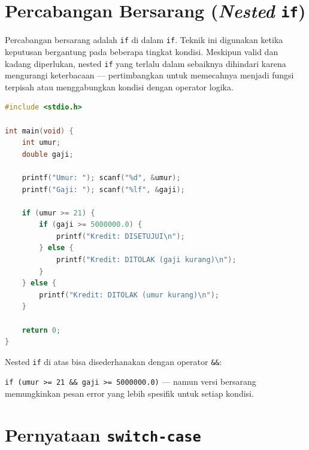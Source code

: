 \documentclass[../main.tex]{subfiles}
\begin{document}
\section{Percabangan Bersarang (\textit{Nested} \texttt{if})}

Percabangan bersarang adalah \texttt{if} di dalam \texttt{if}. Teknik ini digunakan ketika keputusan bergantung pada beberapa tingkat kondisi. Meskipun valid dan kadang diperlukan, nested \texttt{if} yang terlalu dalam sebaiknya dihindari karena mengurangi keterbacaan --- pertimbangkan untuk memecahnya menjadi fungsi terpisah atau menggabungkan kondisi dengan operator logika.

\begin{lstlisting}[language=C,caption=Nested \texttt{if} --- kelayakan kredit]
#include <stdio.h>

int main(void) {
    int umur;
    double gaji;
    
    printf("Umur: "); scanf("%d", &umur);
    printf("Gaji: "); scanf("%lf", &gaji);
    
    if (umur >= 21) {
        if (gaji >= 5000000.0) {
            printf("Kredit: DISETUJUI\n");
        } else {
            printf("Kredit: DITOLAK (gaji kurang)\n");
        }
    } else {
        printf("Kredit: DITOLAK (umur kurang)\n");
    }
    
    return 0;
}
\end{lstlisting}

\begin{catatan}
Nested \texttt{if} di atas bisa disederhanakan dengan operator \texttt{\&\&}:

\texttt{if (umur >= 21 \&\& gaji >= 5000000.0)} --- namun versi bersarang memungkinkan pesan error yang lebih spesifik untuk setiap kondisi.
\end{catatan}



\section{Pernyataan \texttt{switch-case}}
\end{document}

